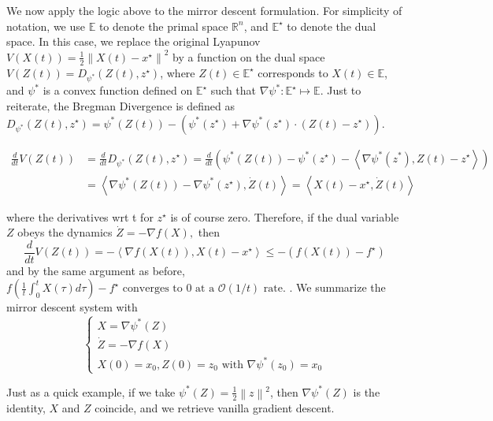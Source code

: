 \documentclass{article}
\begin{document}
We now apply the logic above to the mirror descent formulation. For simplicity of notation, we use $\mathbb{E}$ to denote the primal space $\mathbb{R}^{n}$, and $\mathbb{E^{\star}}$ to denote the dual space. In this case, we replace the original Lyapunov $V(X(t))=\frac{1}{2}\left\|X(t)-x^{\star}\right\|^{2}$ by a function on the dual space $V(Z(t))=D_{\psi^{*}}\left(Z(t), z^{\star}\right)$, where $Z(t) \in \mathbb{E^{\star}}$ corresponds to $X(t) \in \mathbb{E}$, and $\psi^{*}$ is a convex function defined on $\mathbb{E^{\star}}$ such that $\nabla \psi^{*}: \mathbb{E^{\star}}\mapsto \mathbb{E}$. Just to reiterate, the Bregman Divergence is defined as $D_{\psi^{*}}\left(Z(t), z^{\star}\right) = \psi^{*}(Z(t))-(\psi^{*}(z^{\star})+\nabla \psi^{*}(z^{\star}) \cdot(Z(t)-z^{\star}))$.


\begin{equation*}
    \begin{aligned}
    \frac{d}{d t} V(Z(t)) &=\frac{d}{d t} D_{\psi^{*}}\left(Z(t), z^{\star}\right)=\frac{d}{d t}\left(\psi^{*}(Z(t))-\psi^{*}\left(z^{\star}\right)-\left\langle\nabla \psi^{*}\left(z^{*}\right), Z(t)-z^{\star}\right\rangle\right) \\
    &=\left\langle\nabla \psi^{*}(Z(t))-\nabla \psi^{*}\left(z^{\star}\right), \dot{Z}(t)\right\rangle=\left\langle X(t)-x^{\star}, \dot{Z}(t)\right\rangle
    \end{aligned}
\end{equation*}

where the derivatives wrt t for $z^{\star}$ is of course zero. Therefore, if the dual variable $Z$ obeys the dynamics $\dot{Z}=-\nabla f(X),$ then
$$
\frac{d}{d t} V(Z(t))=-\left\langle\nabla f(X(t)), X(t)-x^{\star}\right\rangle \leq-\left(f(X(t))-f^{\star}\right)
$$and by the same argument as before, $f\left(\frac{1}{t} \int_{0}^{t} X(\tau) d \tau\right)-f^{\star} \text { converges to } 0 \text { at a } \mathcal{O}(1 / t) \text { rate. }$. We summarize the mirror descent system with
\begin{equation*}
    \left\{\begin{array}{l}
    X=\nabla \psi^{*}(Z) \\
    \dot{Z}=-\nabla f(X) \\
    X(0)=x_{0}, Z(0)=z_{0} \text { with } \nabla \psi^{*}\left(z_{0}\right)=x_{0}
    \end{array}\right.
\end{equation*}

Just as a quick example, if we take $\psi^{*}(Z) = \frac{1}{2} \left\|z\right\|^{2}$, then $\nabla \psi^{*}(Z)$ is the identity, $X$ and $Z$ coincide, and we retrieve vanilla gradient descent.\\
\end{document}
